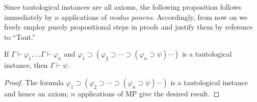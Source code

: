 \documentclass[../../include/open-logic-section]{subfiles}
\begin{document}
\begin{explain}
Since tautological instances are all axioms, the following proposition
follows immediately by $n$ applications of \emph{modus
  ponens}. Accordingly, from now on we freely employ purely
propositional steps in proofs and justify them by reference to
``Taut.''
\end{explain}

\begin{prop}
  If $\Gamma \vdash \varphi_1 ,\ldots \Gamma \vdash \varphi_n$ and
  $\varphi_1 \supset (\varphi_2 \supset \cdots \supset(\varphi_n
  \supset \psi) \cdots )$ is a tautological instance, then $\Gamma
  \vdash \psi$.
\end{prop}

\begin{proof}
  The formula   $\varphi_1 \supset (\varphi_2 \supset \cdots \supset(\varphi_n
  \supset \psi) \cdots )$ is a tautological instance and hence an
  axiom; $n$ applications of MP give the desired result.
\end{proof}
\end{document}
